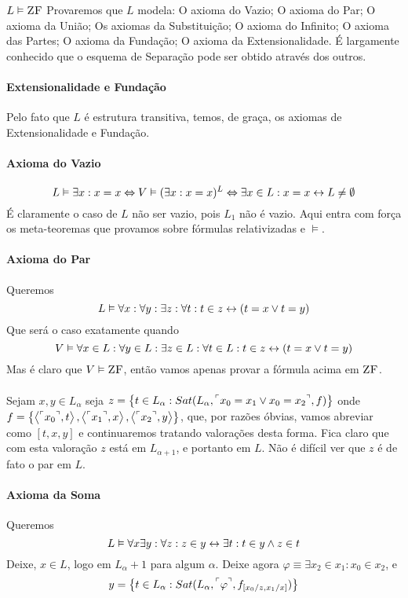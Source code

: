         \begin{theorem}{$L\vDash\text{\sc ZF}$}
                Provaremos que $L$ modela: O axioma do Vazio; O axioma do Par; O axioma 
                da União; Os axiomas da Substituição; O axioma do Infinito; O axioma das 
                Partes; O axioma da Fundação; O axioma da Extensionalidade. É largamente 
                conhecido que o esquema de Separação pode ser obtido através dos outros.
            \paragraph{Extensionalidade e Fundação}
                Pelo fato que $L$ é estrutura transitiva, temos, de graça, os axiomas de 
                Extensionalidade e Fundação.
            \paragraph{Axioma do Vazio}
                $$L\vDash\exists x:x=x\Leftrightarrow V\vDash(\exists x:x=x)^L\Leftrightarrow\exists x\in L: x = x\leftrightarrow L\not = \emptyset$$
                É claramente o caso de $L$ não ser vazio, pois $L_1$ não é vazio. Aqui entra com força os meta-teoremas 
                que provamos sobre fórmulas relativizadas e $\vDash$.
            \paragraph{Axioma do Par}\nl
                Queremos
                $$L\vDash\forall x:\forall y:\exists z:\forall t: t\in z \leftrightarrow (t = x\lor t = y)$$
                Que será o caso exatamente quando 
                $$V\vDash\forall x\in L:\forall y\in L:\exists z\in L:\forall t\in L: t\in z \leftrightarrow (t = x\lor t = y) $$
                Mas é claro que $V\vDash\text{\sc ZF}$, então vamos apenas provar a fórmula acima em $\text{\sc ZF}$.
            \paragraph{}
                Sejam $x,y\in L_{\alpha}$ seja $z = \SET{t\in L_{\alpha}: Sat(L_\alpha, \FMLA{x_0 = x_1 \lor x_0 = x_2}, f)}$
                onde $f=\SET{\TUPLE{\FMLA{x_0}}{t}}{\TUPLE{\FMLA{x_1}}{x}}{\TUPLE{\FMLA{x_2}}{y}}$, que, por razões óbvias, vamos 
                abreviar como $[t,x,y]$ e continuaremos tratando valorações desta forma. Fica claro que com esta valoração 
                $z$ está em $L_{\alpha+1}$, e portanto em $L$. Não é difícil ver que $z$ é de fato o par em $L$.
            \paragraph{Axioma da Soma}\nl
                Queremos 
                $$L\vDash\forall x\exists y:\forall z: z\in y \leftrightarrow \exists t: t\in y\land z\in t$$
                Deixe, $x\in L$, logo em $L_\alpha+1$ para algum $\alpha$. Deixe agora $\varphi\equiv\exists x_2\in x_1:x_0\in x_2$, e 
                $$ y = \SET{t\in L_\alpha : Sat(L_\alpha, \FMLA{\varphi}, f_{[x_0\slash z, x_1\slash x]})}$$


\end{theorem}
